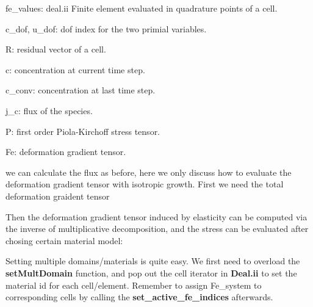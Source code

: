 fe\+\_\+values\+: deal.\+ii Finite element evaluated in quadrature points of a cell.

c\+\_\+dof, u\+\_\+dof\+: dof index for the two primial variables.

R\+: residual vector of a cell.

c\+: concentration at current time step.

c\+\_\+conv\+: concentration at last time step.

j\+\_\+c\+: flux of the species.

P\+: first order Piola-\/\+Kirchoff stress tensor.

Fe\+: deformation gradient tensor.





we can calculate the flux as before, here we only discuss how to evaluate the deformation gradient tensor with isotropic growth. First we need the total deformation graident tensor 
\begin{DoxyCode}{0}
\end{DoxyCode}
 Then the deformation gradient tensor induced by elasticity can be computed via the inverse of multiplicative decomposition, and the stress can be evaluated after chosing certain material model\+: 
\begin{DoxyCode}{0}
\DoxyCodeLine{}
\DoxyCodeLine{        \}}
\DoxyCodeLine{    \}}
\DoxyCodeLine{\}}
\end{DoxyCode}
 Setting multiple domains/materials is quite easy. We first need to overload the {\bfseries{set\+Mult\+Domain}} function, and pop out the cell iterator in {\bfseries{Deal.\+ii}} to set the material id for each cell/element. Remember to assign Fe\+\_\+system to corresponding cells by calling the {\bfseries{set\+\_\+active\+\_\+fe\+\_\+indices}} afterwards. 
